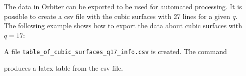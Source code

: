 The data in Orbiter can be exported to be used for automated processing. 
It is possible to create a csv file with the cubic surfaces with 27 lines for a given $q$.
The following example shows how to export the data about cubic surfaces with $q=17$:
{\tt

}
{\tt

}
A file \verb'table_of_cubic_surfaces_q17_info.csv' is created.
The command 
{\tt

}
produces a latex table from the csv file.

